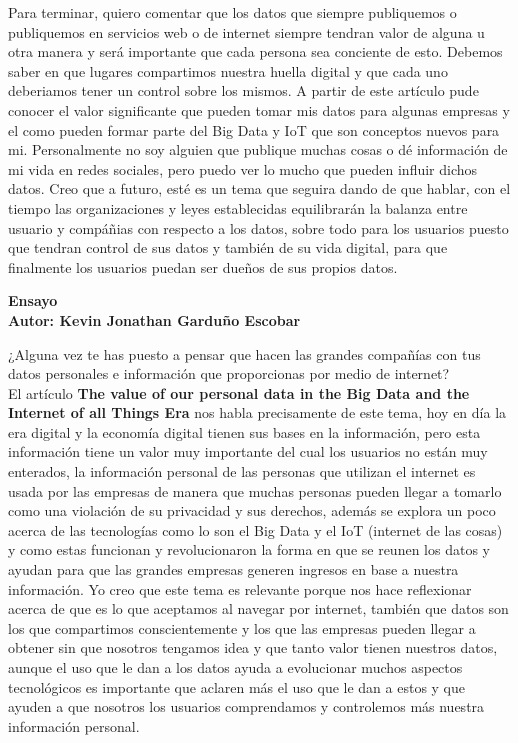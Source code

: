 \documentclass[12pt]{report}
\begin{document}
\begin{enumerate}[label=\textbf{\arabic*.}, leftmargin=*]
\begin{enumerate}[label=\textbf{\alph*.}, leftmargin=*, itemsep=1.0em]
Para terminar, quiero comentar que los datos que siempre publiquemos o publiquemos en servicios web o de internet siempre tendran valor de alguna u otra manera y será importante que cada persona sea conciente de esto. Debemos saber en que lugares compartimos nuestra huella digital y que cada uno deberiamos tener un control sobre los mismos. A partir de este artículo pude conocer el valor significante que pueden tomar mis datos para algunas empresas y el como pueden formar parte del Big Data y IoT que son conceptos nuevos para mi. Personalmente no soy alguien que publique muchas cosas o dé información de mi vida en redes sociales, pero puedo ver lo mucho que pueden influir dichos datos. Creo que a futuro, esté es un tema que seguira dando de que hablar, con el tiempo las organizaciones y leyes establecidas equilibrarán la balanza entre usuario y compáñias con respecto a los datos, sobre todo para los usuarios puesto que tendran control de sus datos y también de su vida digital, para que finalmente los usuarios puedan ser dueños de sus propios datos. 

\newpage
\textbf{Ensayo\\
        Autor: Kevin Jonathan Garduño Escobar}

¿Alguna vez te has puesto a pensar que hacen las grandes compañías con tus datos personales e información que proporcionas por medio de internet?\\

El artículo \textbf{The value of our personal data in the Big Data and the Internet of all Things Era} nos habla precisamente de este tema, hoy en día la era digital y la economía digital tienen sus bases en la información, pero esta información tiene un valor muy importante del cual los usuarios no están muy enterados, la información personal de las personas que utilizan el internet es usada por las empresas de manera que muchas personas pueden llegar a tomarlo como una violación de su privacidad y sus derechos, además se explora un poco acerca de las tecnologías como lo son el Big Data y el IoT (internet de las cosas) y como estas funcionan y revolucionaron la forma en que se reunen los datos y ayudan para que las grandes empresas generen ingresos en base a nuestra información. Yo creo que este tema es relevante porque nos hace reflexionar acerca de que es lo que aceptamos al navegar por internet, también que datos son los que compartimos conscientemente y los que las empresas pueden llegar a obtener sin que nosotros tengamos idea y que tanto valor tienen nuestros datos, aunque el uso que le dan a los datos ayuda a evolucionar muchos aspectos tecnológicos es importante que aclaren más el uso que le dan a estos y que ayuden a que nosotros los usuarios comprendamos y controlemos más nuestra información personal.\\


\end{enumerate}
\end{enumerate}
\end{document}
